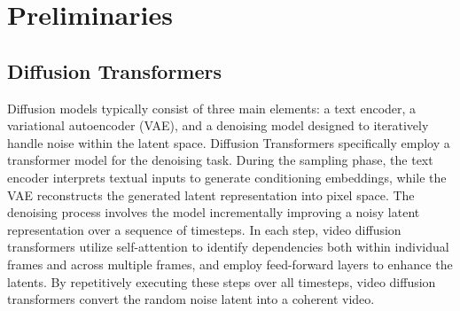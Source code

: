 \section{Preliminaries}

\subsection{Diffusion Transformers}

Diffusion models typically consist of three main elements: a text encoder, a variational autoencoder (VAE), and a denoising model designed to iteratively handle noise within the latent space. Diffusion Transformers specifically employ a transformer model for the denoising task.  
During the sampling phase, the text encoder interprets textual inputs to generate conditioning embeddings, while the VAE reconstructs the generated latent representation into pixel space. 
The denoising process involves the model incrementally improving a noisy latent representation over a sequence of timesteps. 
In each step, video diffusion transformers utilize self-attention to identify dependencies both within individual frames and across multiple frames, and employ feed-forward layers to enhance the latents.
By repetitively executing these steps over all timesteps, video diffusion transformers convert the random noise latent into a coherent video. 






